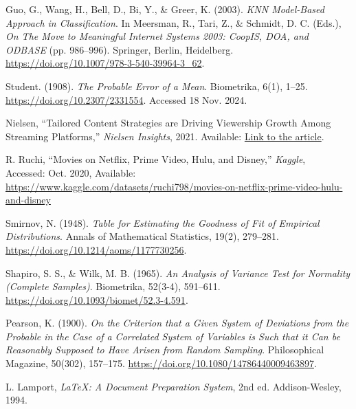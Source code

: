 \documentclass[a4paper, 12pt]{article}
\begin{document}
\begingroup
\renewcommand{\section}[2]{}%
    \begin{thebibliography}{15}

Guo, G., Wang, H., Bell, D., Bi, Y., \& Greer, K. (2003). 
\textit{KNN Model-Based Approach in Classification}. 
In Meersman, R., Tari, Z., \& Schmidt, D. C. (Eds.), 
\textit{On The Move to Meaningful Internet Systems 2003: CoopIS, DOA, and ODBASE} (pp. 986--996). 
Springer, Berlin, Heidelberg. 
\url{https://doi.org/10.1007/978-3-540-39964-3_62}.

Student. (1908).
\textit{The Probable Error of a Mean}.
Biometrika, 6(1), 1--25.
\url{https://doi.org/10.2307/2331554}. Accessed 18 Nov. 2024.


Nielsen, ``Tailored Content Strategies are Driving Viewership Growth Among Streaming Platforms,'' \textit{Nielsen Insights}, 2021. Available: 
\href{https://www.nielsen.com/insights/2021/tailored-content-strategies-are-driving-viewership-growth-among-streaming-platforms/}{Link to the article}.


R. Ruchi, ``Movies on Netflix, Prime Video, Hulu, and Disney,'' \textit{Kaggle}, \\ Accessed: Oct. 2020, Available: \url{https://www.kaggle.com/datasets/ruchi798/movies-on-netflix-prime-video-hulu-and-disney}

Smirnov, N. (1948). 
\textit{Table for Estimating the Goodness of Fit of Empirical Distributions}. 
Annals of Mathematical Statistics, 19(2), 279--281.
\url{https://doi.org/10.1214/aoms/1177730256}.

Shapiro, S. S., \& Wilk, M. B. (1965).
\textit{An Analysis of Variance Test for Normality (Complete Samples)}.
Biometrika, 52(3-4), 591--611.
\url{https://doi.org/10.1093/biomet/52.3-4.591}.

Pearson, K. (1900).
\textit{On the Criterion that a Given System of Deviations from the Probable in the Case of a Correlated System of Variables is Such that it Can be Reasonably Supposed to Have Arisen from Random Sampling}.
Philosophical Magazine, 50(302), 157--175.
\url{https://doi.org/10.1080/14786440009463897}.


L. Lamport, \textit{\LaTeX: A Document Preparation System}, 2nd ed. Addison-Wesley, 1994.


\end{thebibliography}
\end{document}
